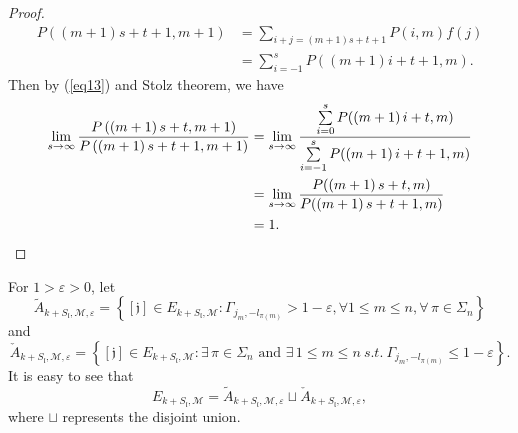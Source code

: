 \documentclass[11pt]{article}
\theoremstyle{plain}
\theoremstyle{definition}
\begin{document}
\begin{proof}
$$\begin{aligned}
     	P\left ( \left ( m+1 \right ) s+t+1,m+1  \right ) &=\sum\limits_{i+j=\left ( m+1 \right ) s+t+1}P(i,m)f(j)
     	\\&= \sum\limits_{i=-1}^{s } P(\left ( m+1 \right ) i+t+1,m).
     \end{aligned}$$
     Then by (\ref{eq13}) and Stolz theorem, we have
     \begin{align*}
     \lim_{s \to \infty}\frac{P\left ( \left ( m+1 \right ) s+t,m+1  \right ) }{P\left ( \left ( m+1 \right ) s+t+1,m+1  \right )} &=\lim_{s \to \infty}\frac{ \sum\limits_{i=0}^{s } P(\left ( m+1 \right ) i+t,m)}{\sum\limits_{i=-1}^{s } P(\left ( m+1 \right ) i+t+1,m)}
     \\&= \lim_{s \to \infty}\frac{  P(\left ( m+1 \right ) s+t,m)}{ P(\left ( m+1 \right ) s+t+1,m)}
     \\&= 1.   \qedhere
     \end{align*}
\end{proof}
For $1>\varepsilon >0$, let
\begin{equation}\label{eq161}\tilde{A}_{k+S_\mathfrak{l},\mathscr{M},\varepsilon } =\left \{ [\mathfrak{j}] \in E_{k+S_\mathfrak{l},\mathscr{M} }:\Gamma_{j_{m},-l_{\pi  (m)}} > 1 - \varepsilon,  \forall 1 \leq m \leq n, \forall \, \pi \in \Sigma_{n}   \right \}\end{equation}
and
$$\check{A}  _{k+S_\mathfrak{l},\mathscr{M},\varepsilon } =\left \{ [\mathfrak{j}] \in E_{k+S_\mathfrak{l},\mathscr{M} }:\exists \, \pi \in \Sigma_{n} \text{ and } \exists \, 1 \le m \le n ~s.t.~
\Gamma_{j_{m},-l_{\pi  (m)}} \le 1  - \varepsilon \right \}.$$
It is easy to see that
\begin{equation}\label{eq16}
	E_{k+S_\mathfrak{l},\mathscr{M} } = \tilde{A}_{k+S_\mathfrak{l},\mathscr{M},\varepsilon } \sqcup \check{A}  _{k+S_\mathfrak{l},\mathscr{M},\varepsilon },
\end{equation}
where $\sqcup$ represents the disjoint union.
\end{document}
